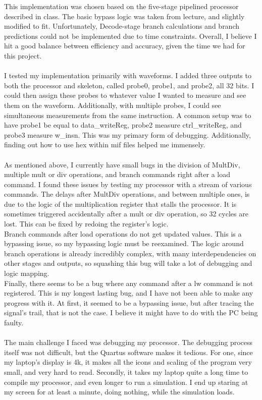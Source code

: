 \documentclass[letterpaper]{article} %
\begin{document}
This implementation was chosen based on the five-stage pipelined processor described in class. The basic bypass logic was taken from lecture, and slightly modified to fit. Unfortunately, Decode-stage branch calculations and branch predictions could not be implemented due to time constraints. Overall, I believe I hit a good balance between efficiency and accuracy, given the time we had for this project. \\ \\
I tested my implementation primarily with waveforms. I added three outputs to both the processor and skeleton, called probe0, probe1, and probe2, all 32 bits. I could then assign these probes to whatever value I wanted to measure and see them on the waveform. Additionally, with multiple probes, I could see simultaneous measurements from the same instruction. A common setup was to have probe1 be equal to data\_writeReg, probe2 measure ctrl\_writeReg, and probe3 measure w\_insn. This was my primary form of debugging. Additionally, finding out how to use hex within mif files helped me immensely. \\ \\
As mentioned above, I currently have small bugs in the division of MultDiv, multiple mult or div operations, and branch commands right after a load command. I found these issues by testing my processor with a stream of various commands. The delays after MultDiv operations, and between multiple ones, is due to the logic of the multiplication register that stalls the processor. It is sometimes triggered accidentally after a mult or div operation, so 32 cycles are lost. This can be fixed by redoing the register's logic. \\
Branch commands after load operations do not get updated values. This is a bypassing issue, so my bypassing logic must be reexamined. The logic around branch operations is already incredibly complex, with many interdependencies on other stages and outputs, so squashing this bug will take a lot of debugging and logic mapping. \\ 
Finally, there seems to be a bug where any command after a lw command is not registered. This is my longest lasting bug, and I have not been able to make any progress with it. At first, it seemed to be a bypassing issue, but after tracing the signal's trail, that is not the case. I believe it might have to do with the PC being faulty. \\ \\
The main challenge I faced was debugging my processor. The debugging process itself was not difficult, but the Quartus software makes it tedious. For one, since my laptop's display is 4k, it makes all the icons and scaling of the program very small, and very hard to read. Secondly, it takes my laptop quite a long time to compile my processor, and even longer to run a simulation. I end up staring at my screen for at least a minute, doing nothing, while the simulation loads. \\
\end{document}
